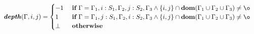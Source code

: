 \[\begin{array}{c}
    \DEPTH{\Gamma, i, j} =
        \begin{cases}
            -1   & \IF \Gamma = \Gamma_1, i: S_1, \Gamma_2, j: S_2, \Gamma_3
                \wedge \{i, j\} \cap \DOM{\Gamma_1 \cup \Gamma_2 \cup \Gamma_3}
                \neq \o \\
            1    & \IF \Gamma = \Gamma_1, j: S_1, \Gamma_2, i: S_2, \Gamma_3
                \wedge \{i, j\} \cap \DOM{\Gamma_1 \cup \Gamma_2 \cup \Gamma_3}
                \neq \o \\
            \bot & \ \textbf{otherwise}
        \end{cases}
\end{array}\]
